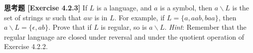 \textbf{思考题 [Exercise 4.2.3]} If $L$ is a language, and $a$ is a symbol, then 
$a\backslash L$ is the set of strings $w$ such that $aw$ is in $L$. For example, if 
$L=\{a,aab,baa\}$, then $a\backslash L = \{\epsilon,ab\}$. Prove that if $L$ is regular,
so is $a\backslash L$. \textit{Hint}: Remember that the regular language are closed 
under reversal and under the quotient operation of Exercise 4.2.2.